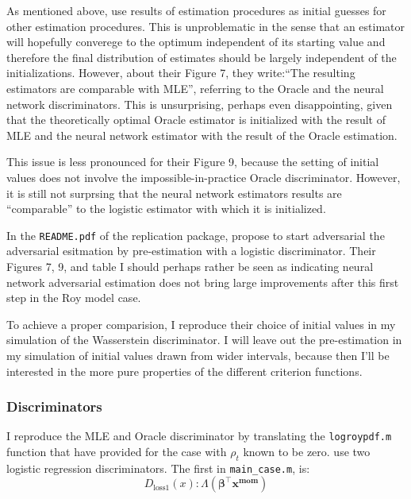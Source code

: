 As mentioned above, \textcite{kaji2023adversarial} use results of estimation procedures as initial guesses for other estimation procedures.
This is unproblematic in the sense that an estimator will hopefully converege to the optimum independent of its starting value and therefore the final distribution of estimates should be largely independent of the initializations.
However, about their Figure 7, they write:``The resulting estimators are comparable with MLE'', referring to the Oracle and the neural network discriminators.
This is unsurprising, perhaps even disappointing, given that the theoretically optimal Oracle estimator is initialized with the result of MLE and the neural network estimator with the result of the Oracle estimation.

This issue is less pronounced for their Figure 9, because the setting of initial values does not involve the impossible-in-practice Oracle discriminator.
However, it is still not surprsing that the neural network estimators results are ``comparable'' to the logistic estimator with which it is initialized.

In the \texttt{README.pdf} of the replication package, \Textcite{kaji2023adversarial} propose to start adversarial the adversarial esitmation by pre-estimation with a logistic discriminator.
Their Figures 7, 9, and table I should perhaps rather be seen as indicating neural network adversarial estimation does not bring large improvements after this first step in the Roy model case.

To achieve a proper comparision, I reproduce their choice of initial values in my simulation of the Wasserstein discriminator.
I will leave out the pre-estimation in my simulation of initial values drawn from wider intervals, because then I'll be interested in the more pure properties of the different criterion functions.

\subsubsection{Discriminators}

I reproduce the MLE and Oracle discriminator by translating the \texttt{logroypdf.m} function that \textcite{kaji2023adversarial} have provided for the case with $\rho_t$ known to be zero.
\textcite{kaji2023adversarial} use two logistic regression discriminators. The first in \texttt{main\_case.m}, is:
\begin{equation}
    D_{\text{loss1}}(x) : \Lambda(\mathbf{\beta}^{\intercal} \mathbf{x^{mom}}) %
\end{equation}

